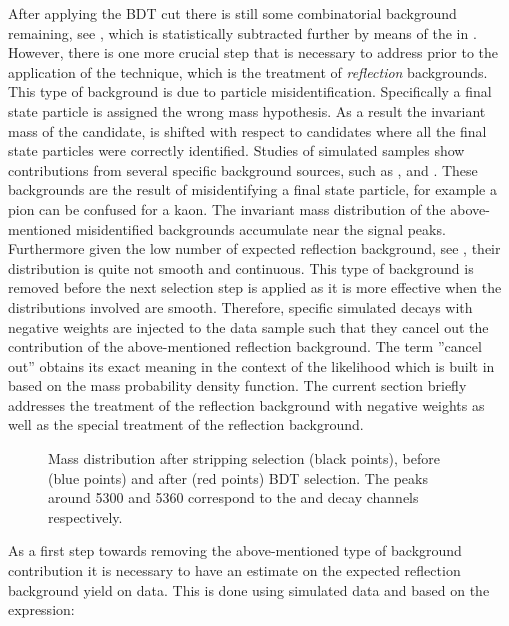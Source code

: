 After applying the BDT cut there is still some combinatorial background remaining, see ,
which is statistically subtracted further by means of the \sWeights in .
However, there is one more crucial step that is necessary to address prior to the application of the
\sPlot technique, which is the treatment of {\it reflection} backgrounds. This type of background is due to particle misidentification.
Specifically a final state particle is assigned the wrong mass hypothesis. As a result the invariant mass of the \Bs candidate,
is shifted with respect to \Bs candidates where all the final state particles were correctly identified.
Studies of simulated samples show contributions
from several specific background sources, such as \BsJpsiKK, \BsJpsipipi and \BdJpsipipi.
These backgrounds are the result of misidentifying a final state particle, for example a pion can
be confused for a kaon. The invariant mass distribution of the above-mentioned misidentified backgrounds
accumulate near the \BJpsiKpi signal peaks. Furthermore given the low number of expected reflection background,
see , their distribution is quite not smooth and continuous. This type of background is
removed before the next selection step is applied as it is more effective when the distributions involved are smooth.
Therefore, specific simulated decays with negative weights
are injected to the data sample such that they cancel out the contribution of the above-mentioned reflection
background. The term ''cancel out'' obtains its exact meaning in the context of the likelihood which is
built in  based on the mass probability density function.
The current section briefly addresses the treatment of the reflection background with negative weights
as well as the special treatment of the \LbJpsippi reflection background.

\begin{figure}[!t]
  \centering
  \scalebox{1}{}
  \caption{Mass distribution after stripping selection (black points), before (blue points) and after (red points) BDT selection.
           The peaks around 5300 and 5360 \mevcc correspond to the \BdJpsiKst and \BsJpsiKst decay channels respectively.}
  \label{mass_BDTG_selection}
\end{figure}

As a first step towards removing the above-mentioned type of background contribution it is necessary to have an estimate
on the expected reflection background yield on data. This is done using simulated data and based on the expression:

